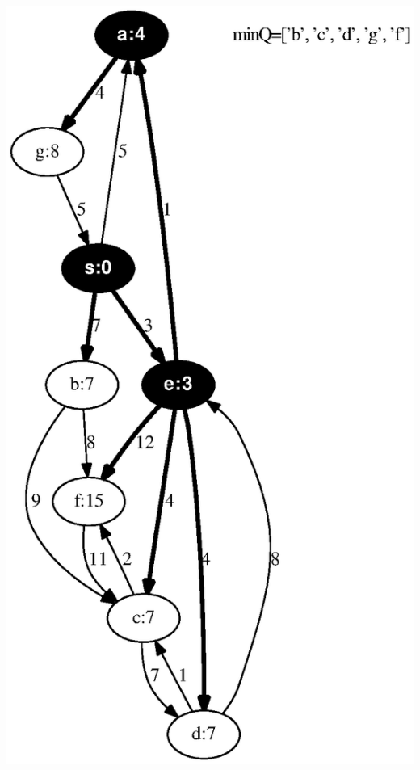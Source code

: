 \documentclass{article}
\begin{document}
\includegraphics[height=.3\textheight]{dijkstra_gross_yellen_03.eps}
\vspace{1em}
\end{document}
